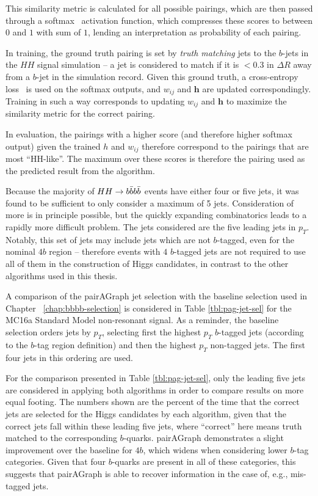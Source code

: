 This similarity metric is calculated for all possible pairings, which are then passed through a 
softmax~\cite{Softmax} activation function, which compresses these scores to between $0$ and $1$ 
with sum of $1$, lending an interpretation as probability of each pairing.

In training, the ground truth pairing is set by \emph{truth matching} jets to the $b$-jets 
in the $HH$ signal simulation -- a jet is considered to match if it is $< 0.3$ in $\Delta R$
away from a $b$-jet in the simulation record. Given this ground truth, a cross-entropy loss~\cite{MLbook}
is used on the softmax outputs, and $w_{ij}$ and $\mathbf{h}$ are updated correspondingly.
Training in such a way corresponds to updating $w_{ij}$ and $\mathbf{h}$ to maximize the similarity 
metric for the correct pairing.

In evaluation, the pairings with a higher score (and therefore higher softmax output) given 
the trained $h$ and $w_{ij}$ therefore correspond to the pairings that are most ``HH-like''. 
The maximum over these scores is therefore the pairing used as the predicted result from 
the algorithm.

Because the majority of $HH\rightarrow b\bar{b}b\bar{b}$ events have either four or five jets, it was 
found to be sufficient to only consider a maximum of 5 jets. Consideration of more is in 
principle possible, but the quickly expanding combinatorics leads to a rapidly more 
difficult problem. The jets considered are the five leading jets in $p_{T}$. Notably, 
this set of jets may include jets which are not $b$-tagged, even for the nominal $4b$ 
region -- therefore events with $4$ $b$-tagged jets are not required to use all of them 
in the construction of Higgs candidates, in contrast to the other algorithms used in this 
thesis.

A comparison of the pairAGraph jet selection with the baseline selection used in Chapter ~\ref{chap:bbbb-selection} 
is considered in Table \ref{tbl:pag-jet-sel} for the MC16a Standard Model non-resonant signal. As a reminder, 
the baseline selection orders jets by $p_{T}$, selecting first the highest $p_{T}$ $b$-tagged jets (according 
to the $b$-tag region definition) and then the highest $p_{T}$ non-tagged jets. The first four jets 
in this ordering are used. 

For the comparison presented in Table \ref{tbl:pag-jet-sel}, only the leading five jets are considered in 
applying both algorithms in order to compare results on more equal footing. The numbers shown are the percent 
of the time that the correct jets are selected for the Higgs candidates by each algorithm, given that the 
correct jets fall within these leading five jets, where ``correct'' here means truth matched to the 
corresponding $b$-quarks. pairAGraph demonstrates a slight improvement over the baseline for $4b$, which widens when 
considering lower $b$-tag categories. Given that four $b$-quarks are present in all of these 
categories, this suggests that pairAGraph is able to recover information in the case of, e.g., mis-tagged 
jets.

